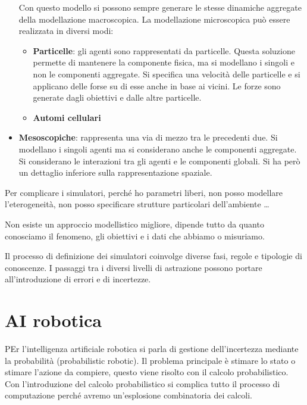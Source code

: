 \begin{itemize}
            Con questo modello si possono sempre generare le stesse dinamiche
            aggregate della modellazione macroscopica. La modellazione
            microscopica può essere realizzata in diversi modi:
            \begin{itemize}
                  \item \textbf{Particelle}: gli agenti sono rappresentati da
                        particelle. Questa soluzione permette di mantenere la
                        componente fisica, ma si modellano i singoli e non le
                        componenti aggregate. Si specifica una velocità delle
                        particelle e si applicano delle forse su di esse anche in
                        base ai vicini. Le forze sono generate dagli obiettivi e dalle
                        altre particelle.
                  \item \textbf{Automi cellulari}
            \end{itemize}
      \item \textbf{Mesoscopiche}: rappresenta una via di mezzo tra le precedenti
            due. Si modellano i singoli agenti ma si considerano anche le componenti
            aggregate. Si considerano le interazioni tra gli agenti e le componenti
            globali. Si ha però un dettaglio inferiore sulla rappresentazione
            spaziale.
\end{itemize}
Per complicare i simulatori, perché ho parametri liberi, non posso modellare
l'eterogeneità, non posso specificare strutture particolari dell'ambiente \dots
\begin{nota}
      Non esiste un approccio modellistico migliore, dipende tutto da quanto
      conosciamo il fenomeno, gli obiettivi e i dati che abbiamo o misuriamo.
\end{nota}
Il processo di definizione dei simulatori coinvolge diverse fasi, regole e
tipologie di conoscenze. I passaggi tra i diversi livelli di astrazione possono
portare all'introduzione di errori e di incertezze.

\section{AI robotica}
PEr l'intelligenza artificiale robotica si parla di gestione dell'incertezza mediante 
la probabilità (probabilistic robotic). Il problema principale è stimare lo stato 
o stimare l'azione da compiere, questo viene risolto con il calcolo probabilistico.
Con l'introduzione del calcolo probabilistico si complica tutto il processo di computazione 
perché avremo un'esplosione combinatoria dei calcoli.

